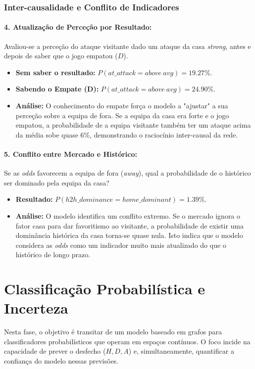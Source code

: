 \documentclass[10pt]{article}
\begin{document}
\subsubsection{Inter-causalidade e Conflito de Indicadores}

\paragraph{4. Atualização de Perceção por Resultado:}
Avaliou-se a perceção do ataque visitante dado um ataque da casa \textit{strong}, antes e depois de saber que o jogo empatou ($D$).
\begin{itemize}
    \item \textbf{Sem saber o resultado:} $P(at\_attack = above\ avg) = 19.27\%$.
    \item \textbf{Sabendo o Empate (D):} $P(at\_attack = above\ avg) = 24.90\%$.
    \item \textbf{Análise:} O conhecimento do empate força o modelo a "ajustar" a sua perceção sobre a equipa de fora. Se a equipa da casa era forte e o jogo empatou, a probabilidade de a equipa visitante também ter um ataque acima da média sobe quase 6\%, demonstrando o raciocínio inter-causal da rede.
\end{itemize}

\paragraph{5. Conflito entre Mercado e Histórico:}
Se as \textit{odds} favorecem a equipa de fora (\textit{away}), qual a probabilidade de o histórico ser dominado pela equipa da casa?
\begin{itemize}
    \item \textbf{Resultado:} $P(h2h\_dominance = home\_dominant) = 1.39\%$.
    \item \textbf{Análise:} O modelo identifica um conflito extremo. Se o mercado ignora o fator casa para dar favoritismo ao visitante, a probabilidade de existir uma dominância histórica da casa torna-se quase nula. Isto indica que o modelo considera as \textit{odds} como um indicador muito mais atualizado do que o histórico de longo prazo.
\end{itemize}

\section{Classificação Probabilística e Incerteza}

Nesta fase, o objetivo é transitar de um modelo baseado em grafos para classificadores probabilísticos que operam em espaços contínuos. O foco incide na capacidade de prever o desfecho ($H, D, A$) e, simultaneamente, quantificar a confiança do modelo nessas previsões.
\end{document}
